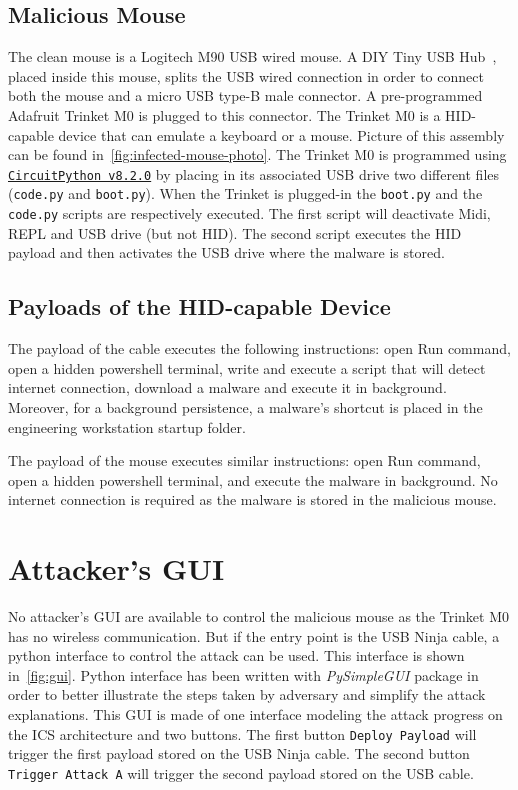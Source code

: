 \subsection{Malicious Mouse}

The clean mouse is a Logitech M90 USB wired mouse. A DIY Tiny USB Hub~\cite{usb-diy-hub}, placed inside this mouse, splits the USB wired connection in order to connect both the mouse and a micro USB type-B male connector. A pre-programmed Adafruit Trinket M0 is plugged to this connector. The Trinket M0 is a HID-capable device that can emulate a keyboard or a mouse. Picture of this assembly can be found in~\autoref{fig:infected-mouse-photo}. The Trinket M0 is programmed using \href{https://circuitpython.org/}{\texttt{CircuitPython v8.2.0}} by placing in its associated USB drive two different files (\texttt{code.py} and \texttt{boot.py}). When the Trinket is plugged-in the \texttt{boot.py} and the \texttt{code.py} scripts are respectively executed. The first script will deactivate Midi, REPL and USB drive (but not HID). The second script executes the HID payload and then activates the USB drive where the malware is stored. 

\subsection{Payloads of the HID-capable Device}

The payload of the cable executes the following instructions: open Run command, open a hidden powershell terminal, write and execute a script that will detect internet connection, download a malware and execute it in background. Moreover, for a background persistence, a malware's shortcut is placed in the engineering workstation startup folder.

The payload of the mouse executes similar instructions: open Run command, open a hidden powershell terminal, and execute the malware in background. No internet connection is required as the malware is stored in the malicious mouse.


\section{Attacker's GUI}

No attacker's GUI are available to control the malicious mouse as the Trinket M0 has no wireless communication. But if the entry point is the USB Ninja cable, a python interface to control the attack can be used. This interface is shown in~\autoref{fig:gui}. Python interface has been written with \emph{PySimpleGUI} package in order to better illustrate the steps taken by adversary and simplify the attack explanations. This GUI is made of one interface modeling the attack progress on the ICS architecture and two buttons. The first button \texttt{Deploy Payload} will trigger the first payload stored on the USB Ninja cable. The second button \texttt{Trigger Attack A} will trigger the second payload stored on the USB cable.

